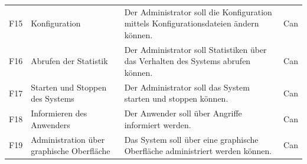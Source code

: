 \documentclass[../review_3.tex]{subfiles}
\begin{document}
\begin{longtable} [h] {p{1cm} p{4cm} p{7cm} l}
    F15                                                                                                                                                                                                              & Konfiguration                                  & Der Administrator soll die Konfiguration mittels Konfigurationsdateien ändern können.                                                                                                                                                                   & Can             \\
    F16                                                                                                                                                                                                              & Abrufen der Statistik                          & Der Administrator soll Statistiken über das Verhalten des Systems abrufen können.                                                                                                                                                                       & Can             \\
    F17                                                                                                                                                                                                              & Starten und Stoppen des Systems                & Der Administrator soll das System starten und stoppen können.                                                                                                                                                                                           & Can             \\
    F18                                                                                                                                                                                                              & Informieren des Anwenders                      & Der Anwender soll über Angriffe informiert werden.                                                                                                                                                                                                      & Can             \\
    F19                                                                                                                                                                                                              & Administration über graphische Oberfläche      & Das System soll über eine graphische Oberfläche administriert werden können.                                                                                                                                                                            & Can             \\

\end{longtable}
\end{document}

